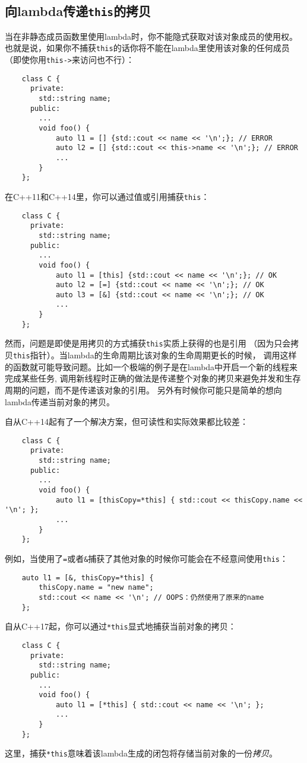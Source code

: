\subsection{向lambda传递\texttt{this}的拷贝}
当在非静态成员函数里使用lambda时，你不能隐式获取对该对象成员的使用权。
也就是说，如果你不捕获\texttt{this}的话你将不能在lambda里使用该对象的任何成员
（即使你用\texttt{this->}来访问也不行）：
\begin{lstlisting}
    class C {
      private:
        std::string name;
      public:
        ...
        void foo() {
            auto l1 = [] {std::cout << name << '\n';}; // ERROR
            auto l2 = [] {std::cout << this->name << '\n';}; // ERROR
            ...
        }
    };
\end{lstlisting}
在C++11和C++14里，你可以通过值或引用捕获\texttt{this}：
\begin{lstlisting}
    class C {
      private:
        std::string name;
      public:
        ...
        void foo() {
            auto l1 = [this] {std::cout << name << '\n';}; // OK
            auto l2 = [=] {std::cout << name << '\n';}; // OK
            auto l3 = [&] {std::cout << name << '\n';}; // OK
            ...
        }
    };
\end{lstlisting}
然而，问题是即使是用拷贝的方式捕获\texttt{this}实质上获得的也是引用
（因为只会拷贝\texttt{this}指针）。当lambda的生命周期比该对象的生命周期更长的时候，
调用这样的函数就可能导致问题。比如一个极端的例子是在lambda中开启一个新的线程来完成某些任务,
调用新线程时正确的做法是传递整个对象的拷贝来避免并发和生存周期的问题，而不是传递该对象的引用。
另外有时候你可能只是简单的想向lambda传递当前对象的拷贝。

自从C++14起有了一个解决方案，但可读性和实际效果都比较差：
\begin{lstlisting}
    class C {
      private:
        std::string name;
      public:
        ...
        void foo() {
            auto l1 = [thisCopy=*this] { std::cout << thisCopy.name << '\n'; };
            ...
        }
    };
\end{lstlisting}
例如，当使用了\texttt{=}或者\texttt{\&}捕获了其他对象的时候你可能会在不经意间使用\texttt{this}：
\begin{lstlisting}
    auto l1 = [&, thisCopy=*this] {
        thisCopy.name = "new name";
        std::cout << name << '\n'; // OOPS：仍然使用了原来的name
    };
\end{lstlisting}
自从C++17起，你可以通过\texttt{*this}显式地捕获当前对象的拷贝：
\begin{lstlisting}
    class C {
      private:
        std::string name;
      public:
        ...
        void foo() {
            auto l1 = [*this] { std::cout << name << '\n'; };
            ...
        }
    };
\end{lstlisting}
这里，捕获\texttt{*this}意味着该lambda生成的闭包将存储当前对象的一份\emph{拷贝}。

